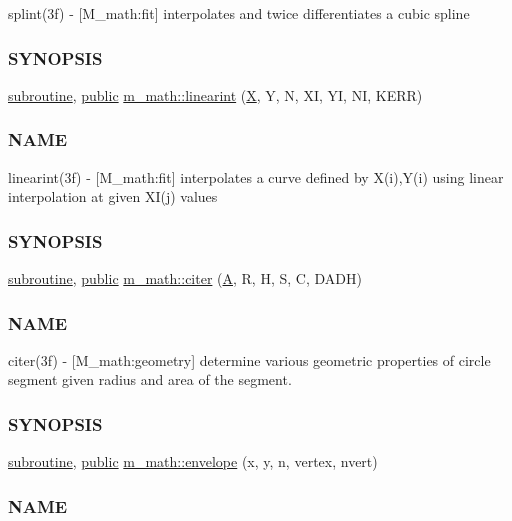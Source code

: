 \begin{DoxyCompactItemize}
\begin{DoxyCompactList}
splint(3f) -\/ \mbox{[}M\+\_\+math\+:fit\mbox{]} interpolates and twice differentiates a cubic spline \subsubsection*{S\+Y\+N\+O\+P\+S\+IS}\end{DoxyCompactList}\item 
\hyperlink{M__stopwatch_83_8txt_acfbcff50169d691ff02d4a123ed70482}{subroutine}, \hyperlink{M__stopwatch_83_8txt_a2f74811300c361e53b430611a7d1769f}{public} \hyperlink{namespacem__math_a506d6c6d2e4da1fa5efb731608531c75}{m\+\_\+math\+::linearint} (\hyperlink{intro__blas1_83_8txt_ac8596739bc875e90fe6e2ecf98e87906}{X}, Y, N, XI, YI, NI, K\+E\+RR)
\begin{DoxyCompactList}\small\item\em \subsubsection*{N\+A\+ME}

linearint(3f) -\/ \mbox{[}M\+\_\+math\+:fit\mbox{]} interpolates a curve defined by X(i),Y(i) using linear interpolation at given X\+I(j) values \subsubsection*{S\+Y\+N\+O\+P\+S\+IS}\end{DoxyCompactList}\item 
\hyperlink{M__stopwatch_83_8txt_acfbcff50169d691ff02d4a123ed70482}{subroutine}, \hyperlink{M__stopwatch_83_8txt_a2f74811300c361e53b430611a7d1769f}{public} \hyperlink{namespacem__math_a14a1fd06462e345989ff976aac03f18d}{m\+\_\+math\+::citer} (\hyperlink{ufpp__overview_81_8txt_a8341271e5f4e3003f6eb1c9547fc9d1a}{A}, R, H, S, C, D\+A\+DH)
\begin{DoxyCompactList}\small\item\em \subsubsection*{N\+A\+ME}

citer(3f) -\/ \mbox{[}M\+\_\+math\+:geometry\mbox{]} determine various geometric properties of circle segment given radius and area of the segment. \subsubsection*{S\+Y\+N\+O\+P\+S\+IS}\end{DoxyCompactList}\item 
\hyperlink{M__stopwatch_83_8txt_acfbcff50169d691ff02d4a123ed70482}{subroutine}, \hyperlink{M__stopwatch_83_8txt_a2f74811300c361e53b430611a7d1769f}{public} \hyperlink{namespacem__math_aec13601dba0398f78ad7b25d964f40a6}{m\+\_\+math\+::envelope} (x, y, n, vertex, nvert)
\begin{DoxyCompactList}\small\item\em \subsubsection*{N\+A\+ME}


\end{DoxyCompactList}
\end{DoxyCompactItemize}
